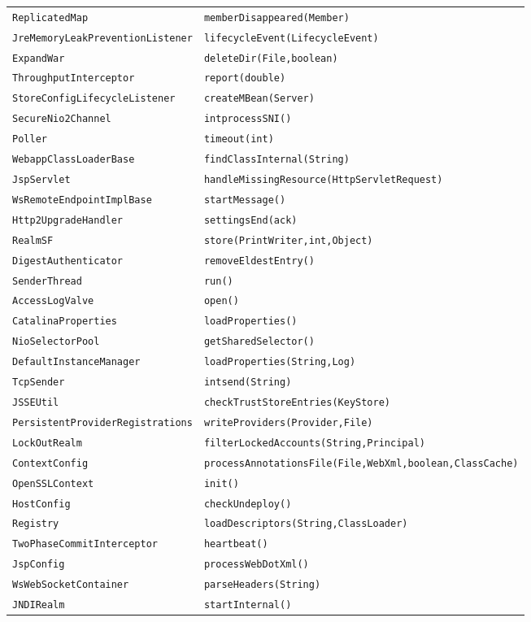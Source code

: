 \begin{center}
\begin{longtable}{ll}
 \lstinline/ReplicatedMap/&{\lstinline/memberDisappeared(Member)/}\\
 \lstinline/JreMemoryLeakPreventionListener/&{\lstinline/lifecycleEvent(LifecycleEvent)/}\\
 \lstinline/ExpandWar/&{\lstinline/deleteDir(File,boolean)/}\\
 \lstinline/ThroughputInterceptor/&{\lstinline/report(double)/}\\
 \lstinline/StoreConfigLifecycleListener/&{\lstinline/createMBean(Server)/}\\
 \lstinline/SecureNio2Channel/&{\lstinline/intprocessSNI()/}\\
 \lstinline/Poller/&{\lstinline/timeout(int)/}\\
 \lstinline/WebappClassLoaderBase/&{\lstinline/findClassInternal(String)/}\\
 \lstinline/JspServlet/&{\lstinline/handleMissingResource(HttpServletRequest)/}\\
 \lstinline/WsRemoteEndpointImplBase/&{\lstinline/startMessage()/}\\
 \lstinline/Http2UpgradeHandler/&{\lstinline/settingsEnd(ack)/}\\
 \lstinline/RealmSF/&{\lstinline/store(PrintWriter,int,Object)/}\\
 \lstinline/DigestAuthenticator/&{\lstinline/removeEldestEntry()/}\\
 \lstinline/SenderThread/&{\lstinline/run()/}\\
 \lstinline/AccessLogValve/&{\lstinline/open()/}\\
 \lstinline/CatalinaProperties/&{\lstinline/loadProperties()/}\\
 \lstinline/NioSelectorPool/&{\lstinline/getSharedSelector()/}\\
 \lstinline/DefaultInstanceManager/&{\lstinline/loadProperties(String,Log)/}\\
 \lstinline/TcpSender/&{\lstinline/intsend(String)/}\\
 \lstinline/JSSEUtil/&{\lstinline/checkTrustStoreEntries(KeyStore)/}\\
 \lstinline/PersistentProviderRegistrations/&{\lstinline/writeProviders(Provider,File)/}\\
 \lstinline/LockOutRealm/&{\lstinline/filterLockedAccounts(String,Principal)/}\\
 \lstinline/ContextConfig/&{\lstinline/processAnnotationsFile(File,WebXml,boolean,ClassCache)/}\\
 \lstinline/OpenSSLContext/&{\lstinline/init()/}\\
 \lstinline/HostConfig/&{\lstinline/checkUndeploy()/}\\
 \lstinline/Registry/&{\lstinline/loadDescriptors(String,ClassLoader)/}\\
 \lstinline/TwoPhaseCommitInterceptor/&{\lstinline/heartbeat()/}\\
 \lstinline/JspConfig/&{\lstinline/processWebDotXml()/}\\
 \lstinline/WsWebSocketContainer/&{\lstinline/parseHeaders(String)/}\\
 \lstinline/JNDIRealm/&{\lstinline/startInternal()/}\\


\end{longtable}
\end{center}
